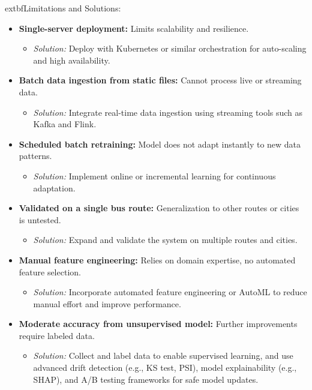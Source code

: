 \documentclass[11pt,a4paper]{article}
\begin{document}
	extbf{Limitations and Solutions:}
\begin{itemize}
    \item \textbf{Single-server deployment:} Limits scalability and resilience.
        \begin{itemize}
            \item \textit{Solution:} Deploy with Kubernetes or similar orchestration for auto-scaling and high availability.
        \end{itemize}
    \item \textbf{Batch data ingestion from static files:} Cannot process live or streaming data.
        \begin{itemize}
            \item \textit{Solution:} Integrate real-time data ingestion using streaming tools such as Kafka and Flink.
        \end{itemize}
    \item \textbf{Scheduled batch retraining:} Model does not adapt instantly to new data patterns.
        \begin{itemize}
            \item \textit{Solution:} Implement online or incremental learning for continuous adaptation.
        \end{itemize}
    \item \textbf{Validated on a single bus route:} Generalization to other routes or cities is untested.
        \begin{itemize}
            \item \textit{Solution:} Expand and validate the system on multiple routes and cities.
        \end{itemize}
    \item \textbf{Manual feature engineering:} Relies on domain expertise, no automated feature selection.
        \begin{itemize}
            \item \textit{Solution:} Incorporate automated feature engineering or AutoML to reduce manual effort and improve performance.
        \end{itemize}
    \item \textbf{Moderate accuracy from unsupervised model:} Further improvements require labeled data.
        \begin{itemize}
            \item \textit{Solution:} Collect and label data to enable supervised learning, and use advanced drift detection (e.g., KS test, PSI), model explainability (e.g., SHAP), and A/B testing frameworks for safe model updates.
        \end{itemize}
\end{itemize}
\end{document}
